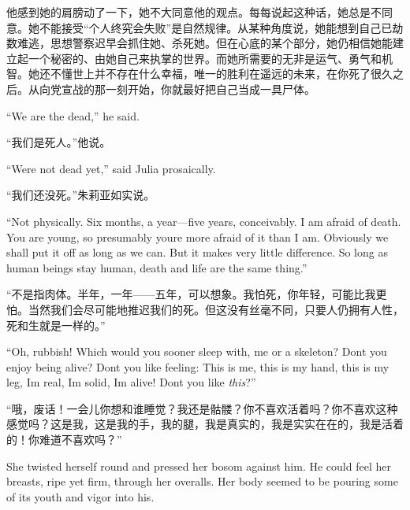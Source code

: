 \begin{paracol}{2}
\switchcolumn

他感到她的肩膀动了一下，她不大同意他的观点。每每说起这种话，她总是不同意。她不能接受``个人终究会失败''是自然规律。从某种角度说，她能想到自己已劫数难逃，思想警察迟早会抓住她、杀死她。但在心底的某个部分，她仍相信她能建立起一个秘密的、由她自己来执掌的世界。而她所需要的无非是运气、勇气和机智。她还不懂世上并不存在什么幸福，唯一的胜利在遥远的未来，在你死了很久之后。从向党宣战的那一刻开始，你就最好把自己当成一具尸体。

\switchcolumn*

``We are the dead,'' he said.

\switchcolumn

``我们是死人。''他说。

\switchcolumn*

``We\textquotesingle re not dead yet,'' said Julia prosaically.

\switchcolumn

``我们还没死。''朱莉亚如实说。

\switchcolumn*

``Not physically. Six months, a year---five years, conceivably. I am
afraid of death. You are young, so presumably you\textquotesingle re
more afraid of it than I am. Obviously we shall put it off as long as we
can. But it makes very little difference. So long as human beings stay
human, death and life are the same thing.''

\switchcolumn

``不是指肉体。半年，一年——五年，可以想象。我怕死，你年轻，可能比我更怕。当然我们会尽可能地推迟我们的死。但这没有丝毫不同，只要人仍拥有人性，死和生就是一样的。''

\switchcolumn*

``Oh, rubbish! Which would you sooner sleep with, me or a skeleton?
Don\textquotesingle t you enjoy being alive? Don\textquotesingle t you
like feeling: This is me, this is my hand, this is my leg,
I\textquotesingle m real, I\textquotesingle m solid, I\textquotesingle m
alive! Don\textquotesingle t you like \emph{this}?''

\switchcolumn

``哦，废话！一会儿你想和谁睡觉？我还是骷髅？你不喜欢活着吗？你不喜欢这种感觉吗？这是我，这是我的手，我的腿，我是真实的，我是实实在在的，我是活着的！你难道不喜欢吗？''

\switchcolumn*

She twisted herself round and pressed her bosom against him. He could
feel her breasts, ripe yet firm, through her overalls. Her body seemed
to be pouring some of its youth and vigor into his.


\end{paracol}
